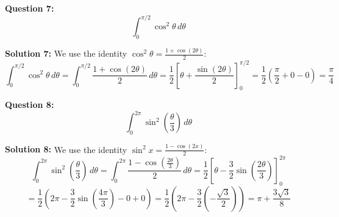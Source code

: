 \documentclass{article}
\begin{document}
\textbf{Question 7:}
\[ \int_0^{\pi/2} \cos^2 \theta \, d\theta \]

\textbf{Solution 7:}
\textcolor[rgb]{1.000, 0.000, 0.000}{We use the identity $\cos^2 \theta = \frac{1 + \cos(2\theta)}{2}$:
\[ \int_0^{\pi/2} \cos^2 \theta \, d\theta = \int_0^{\pi/2} \frac{1 + \cos(2\theta)}{2} \, d\theta = \frac{1}{2} \left[ \theta + \frac{\sin(2\theta)}{2} \right]_0^{\pi/2} = \frac{1}{2} \left( \frac{\pi}{2} + 0 - 0 \right) = \frac{\pi}{4} \]}

\bigskip

\textbf{Question 8:}
\[ \int_0^{2\pi} \sin^2 \left( \frac{\theta}{3} \right) \, d\theta \]

\textbf{Solution 8:}
\textcolor[rgb]{1.000, 0.000, 0.000}{We use the identity $\sin^2 x = \frac{1 - \cos(2x)}{2}$:
\[ \int_0^{2\pi} \sin^2 \left( \frac{\theta}{3} \right) \, d\theta = \int_0^{2\pi} \frac{1 - \cos \left( \frac{2\theta}{3} \right)}{2} \, d\theta = \frac{1}{2} \left[ \theta - \frac{3}{2} \sin \left( \frac{2\theta}{3} \right) \right]_0^{2\pi} \]
\[ = \frac{1}{2} \left( 2\pi - \frac{3}{2} \sin \left( \frac{4\pi}{3} \right) - 0 + 0 \right) = \frac{1}{2} \left( 2\pi - \frac{3}{2} \left( -\frac{\sqrt{3}}{2} \right) \right) = \pi + \frac{3\sqrt{3}}{8} \]}
\end{document}
